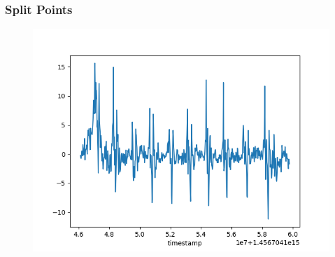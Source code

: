 \documentclass{beamer}
\begin{document}
\begin{frame}

\frametitle{Split Points}

\begin{figure}
	\includegraphics[scale=.15]{vanilla_gyro}
\end{figure}


\end{frame}
\end{document}
